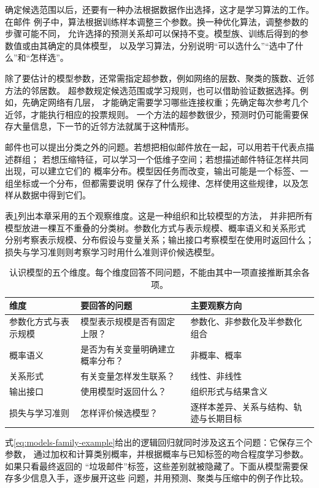 确定候选范围以后，还要有一种办法根据数据作出选择，这才是学习算法的工作。在邮件
例子中，算法根据训练样本调整三个参数。换一种优化算法，调整参数的步骤可能不同，
允许选择的预测关系却可以保持不变。模型族、训练后得到的参数值或由其确定的具体模型，
以及学习算法，分别说明“可以选什么”“选中了什么”和“怎样选”。

除了要估计的模型参数，还常需指定超参数，例如网络的层数、聚类的簇数、近邻方法的邻居数。
超参数规定候选范围或学习规则，也可以借助验证数据选择。例如，先确定网络有几层，
才能确定需要学习哪些连接权重；先确定每次参考几个近邻，才能执行相应的投票规则。
一个方法的超参数很少，预测时仍可能需要保存大量信息，下一节的近邻方法就属于这种情形。

邮件也可以提出分类之外的问题。若想把相似邮件放在一起，可以用若干代表点描述群组；
若想压缩特征，可以学习一个低维子空间；若想描述邮件特征怎样共同出现，可以建立它们的
概率分布。模型因任务而改变，输出可能是一个标签、一组坐标或一个分布，但都需要说明
保存了什么规律、怎样使用这些规律，以及怎样从数据中得到它们。

表\ref{tab:models-dimensions}列出本章采用的五个观察维度。这是一种组织和比较模型的方法，
并非把所有模型放进一棵互不重叠的分类树。参数化方式与表示规模、概率语义和关系形式
分别考察表示规模、分布假设与变量关系；输出接口考察模型在使用时返回什么；
损失与学习准则则考察学习时用什么准则评价候选模型。

\begin{table}[htbp]
  \centering
  \small
  \begin{tabularx}{\linewidth}{@{}lXX@{}}
    \toprule
    \textbf{维度} & \textbf{要回答的问题} & \textbf{主要观察方向} \\
    \midrule
参数化方式与表示规模 & 模型表示规模是否有固定上限？ & 参数化、非参数化及半参数化组合 \\
    概率语义 & 是否为有关变量明确建立概率分布？ & 非概率、概率 \\
    关系形式 & 有关变量怎样发生联系？ & 线性、非线性 \\
    输出接口 & 使用模型时返回什么？ & 组织形式与结果含义 \\
    损失与学习准则 & 怎样评价候选模型？ & 逐样本差异、关系与结构、轨迹与长期目标 \\
    \bottomrule
  \end{tabularx}
  \caption{认识模型的五个维度。每个维度回答不同问题，不能由其中一项直接推断其余各项。}
  \label{tab:models-dimensions}
\end{table}

式\eqref{eq:models-family-example}给出的逻辑回归就同时涉及这五个问题：它保存三个参数，
通过加权和计算类别概率，并根据概率与已知标签的吻合程度学习参数。如果只看最终返回的
“垃圾邮件”标签，这些差别就被隐藏了。下面从模型需要保存多少信息入手，逐步展开这些
问题，并用预测、聚类与压缩中的例子作比较。


